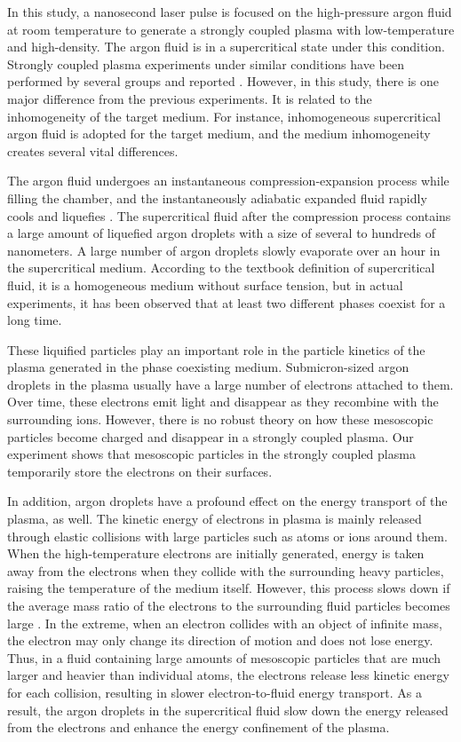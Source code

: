In this study, a nanosecond laser pulse is focused on the high-pressure argon fluid at room temperature to generate a strongly coupled plasma with low-temperature and high-density. The argon fluid is in a supercritical state under this condition. Strongly coupled plasma experiments under similar conditions have been performed by several groups and reported \cite{tsuda2000calculation, harilal2004spatial, bataller2014blackbody, bataller2016observation}. However, in this study, there is one major difference from the previous experiments. It is related to the inhomogeneity of the target medium. For instance, inhomogeneous supercritical argon fluid is adopted for the target medium, and the medium inhomogeneity creates several vital differences.

The argon fluid undergoes an instantaneous compression-expansion process while filling the chamber, and the instantaneously adiabatic expanded fluid rapidly cools and liquefies \cite{lee2021quasi}. The supercritical fluid after the compression process contains a large amount of liquefied argon droplets with a size of several to hundreds of nanometers. A large number of argon droplets slowly evaporate over an hour in the supercritical medium. According to the textbook definition of supercritical fluid, it is a homogeneous medium without surface tension, but in actual experiments, it has been observed that at least two different phases coexist for a long time.

These liquified particles play an important role in the particle kinetics of the plasma generated in the phase coexisting medium. Submicron-sized argon droplets in the plasma usually have a large number of electrons attached to them. Over time, these electrons emit light and disappear as they recombine with the surrounding ions. However, there is no robust theory on how these mesoscopic particles become charged and disappear in a strongly coupled plasma. Our experiment shows that mesoscopic particles in the strongly coupled plasma temporarily store the electrons on their surfaces.

In addition, argon droplets have a profound effect on the energy transport of the plasma, as well. The kinetic energy of electrons in plasma is mainly released through elastic collisions with large particles such as atoms or ions around them. When the high-temperature electrons are initially generated, energy is taken away from the electrons when they collide with the surrounding heavy particles, raising the temperature of the medium itself. However, this process slows down if the average mass ratio of the electrons to the surrounding fluid particles becomes large \cite{bellan2008fundamentals}. In the extreme, when an electron collides with an object of infinite mass, the electron may only change its direction of motion and does not lose energy. Thus, in a fluid containing large amounts of mesoscopic particles that are much larger and heavier than individual atoms, the electrons release less kinetic energy for each collision, resulting in slower electron-to-fluid energy transport. As a result, the argon droplets in the supercritical fluid slow down the energy released from the electrons and enhance the energy confinement of the plasma.

